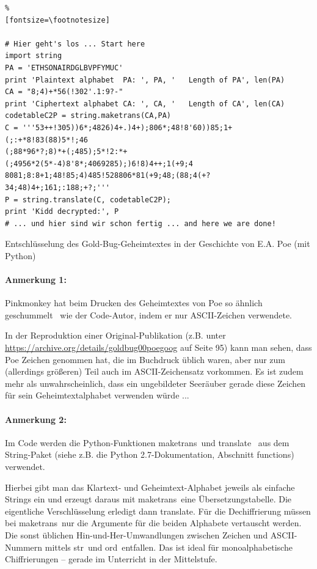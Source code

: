 \begin{sagecode}
\begin{Verbatim}%
[fontsize=\footnotesize]

# Hier geht's los ... Start here
import string
PA = 'ETHSONAIRDGLBVPFYMUC'
print 'Plaintext alphabet  PA: ', PA, '   Length of PA', len(PA)
CA = "8;4)+*56(!302'.1:9?-"
print 'Ciphertext alphabet CA: ', CA, '   Length of CA', len(CA)
codetableC2P = string.maketrans(CA,PA)
C = '''53++!305))6*;4826)4+.)4+);806*;48!8'60))85;1+(;:+*8!83(88)5*!;46
(;88*96*?;8)*+(;485);5*!2:*+(;4956*2(5*-4)8'8*;4069285);)6!8)4++;1(+9;4
8081;8:8+1;48!85;4)485!528806*81(+9;48;(88;4(+?34;48)4+;161;:188;+?;'''
P = string.translate(C, codetableC2P);
print 'Kidd decrypted:', P
# ... und hier sind wir schon fertig ... and here we are done!

\end{Verbatim}
\caption{Entschlüsselung des Gold-Bug-Geheimtextes in der Geschichte von E.A. Poe (mit Python)}
\label{Lit_Python-sample_Gold-bug}
\end{sagecode}

\paragraph*{Anmerkung 1:}
Pinkmonkey hat beim Drucken des Geheimtextes von Poe so ähnlich \glqq geschummelt\grqq~
wie der Code-Autor, indem er nur ASCII-Zeichen verwendete.

In der Reproduktion einer Original-Publikation (z.B. unter
\url{https://archive.org/details/goldbug00poegoog} auf Seite 95) kann man sehen,
dass Poe Zeichen genommen hat, die im Buchdruck üblich waren, aber nur
zum (allerdings größeren) Teil auch im ASCII-Zeichensatz vorkommen. Es ist zudem
mehr als unwahrscheinlich, dass ein ungebildeter Seeräuber gerade diese
Zeichen für sein Geheimtextalphabet verwenden würde ...


\paragraph*{Anmerkung 2:}
Im Code werden die Python-Funktionen \glqq maketrans\grqq~und \glqq translate\grqq~
aus dem String-Paket (siehe z.B. die Python 2.7-Dokumentation, Abschnitt \glqq functions\grqq)
verwendet.

Hierbei gibt man das Klartext- und Geheimtext-Alphabet jeweils als einfache Strings
ein und erzeugt daraus mit \glqq maketrans\grqq~eine Übersetzungstabelle. Die
eigentliche Verschlüsselung erledigt dann \glqq translate\grqq. Für die Dechiffrierung
müssen bei \glqq maketrans\grqq~nur die Argumente für die beiden Alphabete
vertauscht werden. Die sonst üblichen Hin-und-Her-Umwandlungen zwischen Zeichen und
ASCII-Nummern mittels \glqq str\grqq~und \glqq ord\grqq~entfallen.
Das ist ideal für monoalphabetische Chiffrierungen -- gerade im Unterricht in der Mittelstufe.


